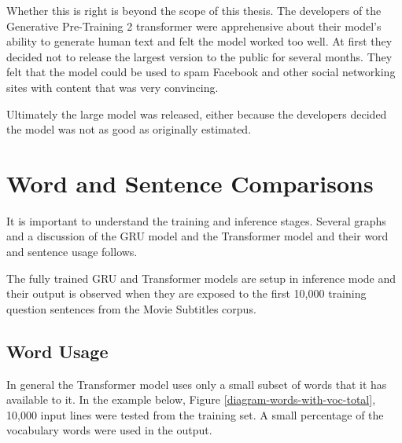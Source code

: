 Whether this is right is beyond the scope of this thesis. The developers of the Generative Pre-Training 2 transformer were apprehensive about their model's ability to generate human text and felt the model worked too well. 
At first they decided not to release the largest version to the public for several months. 
They felt that the model could be used to spam Facebook and other social networking sites with content that was very convincing. 

Ultimately the large model was released, either because the developers decided the model was not as good as originally estimated. %

\section{Word and Sentence Comparisons}

It is important to understand the training and inference stages. Several graphs and a discussion of the GRU model and the Transformer model and their word and sentence usage follows.

The fully trained GRU and Transformer models are setup in inference mode and their output is observed when they are exposed to the first 10,000 training question sentences from the Movie Subtitles corpus.

\subsection{Word Usage}

In general the Transformer model uses only a small subset of words that it has available to it. In the example below, Figure \ref{diagram-words-with-voc-total}, 10,000 input lines were tested from the training set. A small percentage of the vocabulary words were used in the output. %

